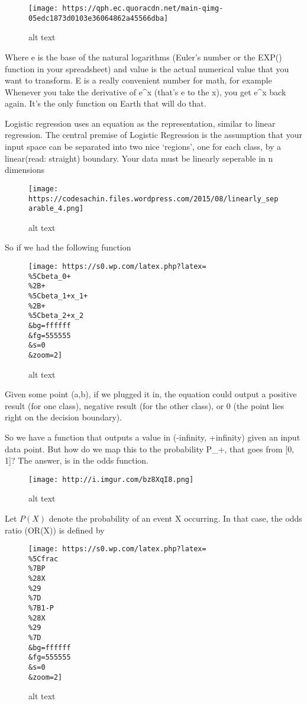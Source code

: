 \documentclass[11pt]{article}
\makeatletter
\def\maxwidth{\ifdim\Gin@nat@width>\linewidth\linewidth
    \else\Gin@nat@width\fi}
\let\Oldincludegraphics\includegraphics
\renewcommand{\includegraphics}[1]{\Oldincludegraphics[width=.8\maxwidth]{#1}}
\makeatother
\begin{document}
\begin{figure}
\centering
\texttt{[image: https://qph.ec.quoracdn.net/main-qimg-05edc1873d0103e36064862a45566dba]}
\caption{alt text}
\end{figure}

Where e is the base of the natural logarithms (Euler's number or the
EXP() function in your spreadsheet) and value is the actual numerical
value that you want to transform. E is a really convenient number for
math, for example Whenever you take the derivative of e\^{}x (that's e
to the x), you get e\^{}x back again. It's the only function on Earth
that will do that.

Logistic regression uses an equation as the representation, similar to
linear regression. The central premise of Logistic Regression is the
assumption that your input space can be separated into two nice
`regions', one for each class, by a linear(read: straight) boundary.
Your data must be linearly seperable in n dimensions

\begin{figure}
\centering
\texttt{[image: https://codesachin.files.wordpress.com/2015/08/linearly\_separable\_4.png]}
\caption{alt text}
\end{figure}

So if we had the following function

\begin{figure}
\centering
\texttt{[image: https://s0.wp.com/latex.php?latex=\\\%5Cbeta\_0+\\\%2B+\\\%5Cbeta\_1+x\_1+\\\%2B+\\\%5Cbeta\_2+x\_2\\\&bg=ffffff\\\&fg=555555\\\&s=0\\\&zoom=2]}
\caption{alt text}
\end{figure}

Given some point (a,b), if we plugged it in, the equation could output a
positive result (for one class), negative result (for the other class),
or 0 (the point lies right on the decision boundary).

So we have a function that outputs a value in (-infinity, +infinity)
given an input data point. But how do we map this to the probability
P\_+, that goes from {[}0, 1{]}? The answer, is in the odds function.

\begin{figure}
\centering
\texttt{[image: http://i.imgur.com/bz8XqI8.png]}
\caption{alt text}
\end{figure}

Let \(P(X)\) denote the probability of an event X occurring. In that
case, the odds ratio (OR(X)) is defined by

\begin{figure}
\centering
\texttt{[image: https://s0.wp.com/latex.php?latex=\\\%5Cfrac\\\%7BP\\\%28X\\\%29\\\%7D\\\%7B1-P\\\%28X\\\%29\\\%7D\\\&bg=ffffff\\\&fg=555555\\\&s=0\\\&zoom=2]}
\caption{alt text}
\end{figure}
\end{document}

